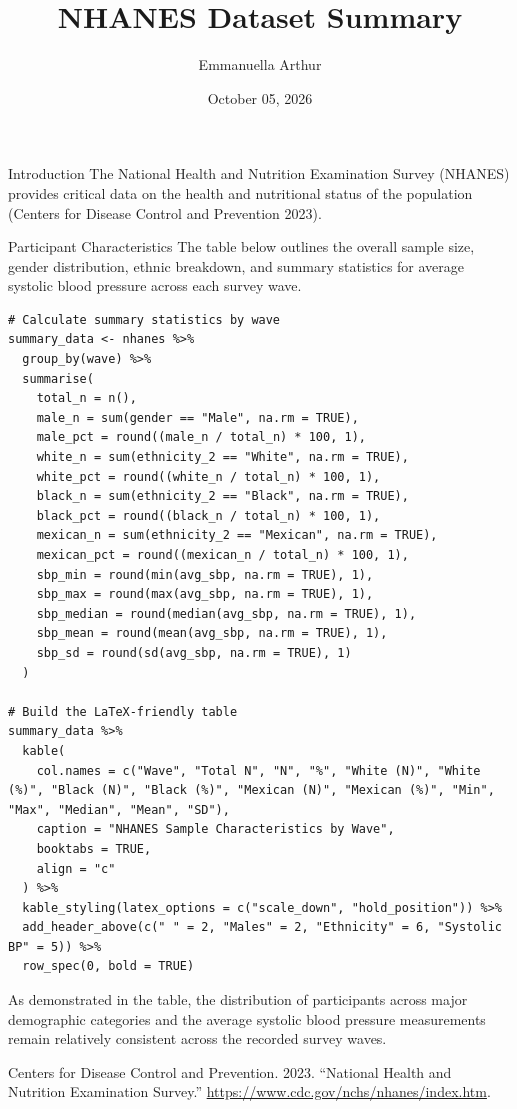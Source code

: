 \documentclass[
]{article}
\title{NHANES Dataset Summary}
\author{Emmanuella Arthur}
\date{October 05, 2026}
\newlength{\cslhangindent}
\newenvironment{CSLReferences}[2] %
 {\begin{list}{}{%
  \setlength{\itemindent}{0pt}
  \setlength{\leftmargin}{0pt}
  \setlength{\parsep}{0pt}
  \ifodd #1
   \setlength{\leftmargin}{\cslhangindent}
   \setlength{\itemindent}{-1\cslhangindent}
  \fi
  \setlength{\itemsep}{#2\baselineskip}}}
 {\end{list}}
\begin{document}
\maketitle

Introduction The National Health and Nutrition Examination Survey
(NHANES) provides critical data on the health and nutritional status of
the population (Centers for Disease Control and Prevention 2023).

Participant Characteristics The table below outlines the overall sample
size, gender distribution, ethnic breakdown, and summary statistics for
average systolic blood pressure across each survey wave.

\begin{verbatim}
# Calculate summary statistics by wave
summary_data <- nhanes %>%
  group_by(wave) %>%
  summarise(
    total_n = n(),
    male_n = sum(gender == "Male", na.rm = TRUE),
    male_pct = round((male_n / total_n) * 100, 1),
    white_n = sum(ethnicity_2 == "White", na.rm = TRUE),
    white_pct = round((white_n / total_n) * 100, 1),
    black_n = sum(ethnicity_2 == "Black", na.rm = TRUE),
    black_pct = round((black_n / total_n) * 100, 1),
    mexican_n = sum(ethnicity_2 == "Mexican", na.rm = TRUE),
    mexican_pct = round((mexican_n / total_n) * 100, 1),
    sbp_min = round(min(avg_sbp, na.rm = TRUE), 1),
    sbp_max = round(max(avg_sbp, na.rm = TRUE), 1),
    sbp_median = round(median(avg_sbp, na.rm = TRUE), 1),
    sbp_mean = round(mean(avg_sbp, na.rm = TRUE), 1),
    sbp_sd = round(sd(avg_sbp, na.rm = TRUE), 1)
  )

# Build the LaTeX-friendly table
summary_data %>%
  kable(
    col.names = c("Wave", "Total N", "N", "%", "White (N)", "White (%)", "Black (N)", "Black (%)", "Mexican (N)", "Mexican (%)", "Min", "Max", "Median", "Mean", "SD"),
    caption = "NHANES Sample Characteristics by Wave",
    booktabs = TRUE,
    align = "c"
  ) %>%
  kable_styling(latex_options = c("scale_down", "hold_position")) %>%
  add_header_above(c(" " = 2, "Males" = 2, "Ethnicity" = 6, "Systolic BP" = 5)) %>%
  row_spec(0, bold = TRUE)
\end{verbatim}

As demonstrated in the table, the distribution of participants across
major demographic categories and the average systolic blood pressure
measurements remain relatively consistent across the recorded survey
waves.

\label{refs}
\begin{CSLReferences}{1}{0}
Centers for Disease Control and Prevention. 2023. {``National Health and
Nutrition Examination Survey.''}
\url{https://www.cdc.gov/nchs/nhanes/index.htm}.

\end{CSLReferences}
\end{document}
